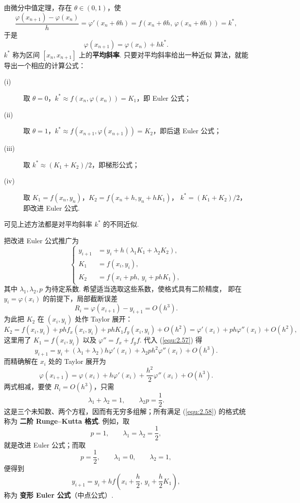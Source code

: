 由微分中值定理，存在 $\theta\in(0,1)$，使
\begin{equation}\label{equ:2.56}
\frac{\varphi(x_{n+1})-\varphi(x_n)}{h}=\varphi'(x_n+\theta h)
=f(x_n+\theta h,\,\varphi(x_n+\theta h))=k^*,
\end{equation}
于是
\[
\varphi(x_{n+1})=\varphi(x_n)+hk^*.
\]
$k^*$ 称为区间 $[x_n,x_{n+1}]$ 上的\textbf{平均斜率}. 只要对平均斜率给出一种近似
算法，就能导出一个相应的计算公式：
\begin{description}
\item[(i)] 取 $\theta=0$，$k^*\approx f(x_n,\varphi(x_n))=K_1$，即 Euler 公式；
\item[(ii)] 取 $\theta=1$，$k^*\approx f(x_{n+1},\varphi(x_{n+1}))=K_2$，即后退 Euler
公式；
\item[(iii)] 取 $k^*\approx(K_1+K_2)/2$，即梯形公式；
\item[(iv)] 取 $K_1=f(x_n,y_n)$，$K_2=f(x_n+h,y_n+hK_1)$，
$k^*=(K_1+K_2)/2$，即改进 Euler 公式.
\end{description}
可见上述方法都是对平均斜率 $k^*$ 的不同近似.

把改进 Euler 公式推广为
\begin{equation}\label{equ:2.57}
\left\{
\begin{aligned}
y_{i+1}&=y_i+h(\lambda_1K_1+\lambda_2K_2),\\
K_1&=f(x_i,y_i),\\
K_2&=f(x_i+ph,\,y_i+phK_1),
\end{aligned}
\right.
\end{equation}
其中 $\lambda_1,\lambda_2,p$ 为待定系数. 希望适当选取这些系数，使格式具有二阶精度，
即在 $y_i=\varphi(x_i)$ 的前提下，局部截断误差
\[
R_i=\varphi(x_{i+1})-y_{i+1}=O(h^3).
\]
为此把 $K_2$ 在 $(x_i,y_i)$ 处作 Taylor 展开：
\[
K_2=f(x_i,y_i)+phf_x(x_i,y_i)+phK_1f_y(x_i,y_i)+O(h^2)
=\varphi'(x_i)+ph\varphi''(x_i)+O(h^2),
\]
这里用了 $K_1=f(x_i,y_i)$ 以及 $\varphi''=f_x+f_yf$. 代入 (\ref{equ:2.57}) 得
\[
y_{i+1}=y_i+(\lambda_1+\lambda_2)h\varphi'(x_i)
+\lambda_2ph^2\varphi''(x_i)+O(h^3).
\]
而精确解在 $x_i$ 处的 Taylor 展开为
\[
\varphi(x_{i+1})=\varphi(x_i)+h\varphi'(x_i)+\frac{h^2}{2}\varphi''(x_i)+O(h^3).
\]
两式相减，要使 $R_i=O(h^3)$，只需
\begin{equation}\label{equ:2.58}
\lambda_1+\lambda_2=1,\qquad \lambda_2p=\frac{1}{2}.
\end{equation}
这是三个未知数、两个方程，因而有无穷多组解；所有满足 (\ref{equ:2.58}) 的格式统称为
\textbf{二阶 Runge--Kutta 格式}. 例如，取
\[
p=1,\qquad \lambda_1=\lambda_2=\frac{1}{2},
\]
就是改进 Euler 公式；而取
\[
p=\frac{1}{2},\qquad \lambda_1=0,\qquad \lambda_2=1,
\]
便得到
\[
y_{i+1}=y_i+hf\left(x_i+\frac{h}{2},\,y_i+\frac{h}{2}K_1\right),
\]
称为 \textbf{变形 Euler 公式}（中点公式）.

